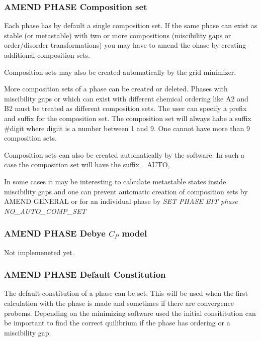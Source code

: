 \documentclass[12pt]{article}
\begin{document}
\subsubsection{AMEND PHASE Composition set}

Each phase has by default a single composition set.  If the same phase
can exist as stable (or metastable) with two or more compositions
(miscibility gaps or order/disorder transformations) you may have to
amend the ohase by creating additional composition sets.  

Composition sets may also be created automatically by the grid
minimizer.

More composition sets of a phase can be created or deleted.  Phases
with miscibility gaps or which can exist with different chemical
ordering like A2 and B2 must be treated as different composition sets.
The user can specify a prefix and suffix for the composition set.  The
composition set will always habe a suffix \#digit where digiit is a
number between 1 and 9.  One cannot have more than 9 composition sets.

Composition sets can also be created automatically by the software.  In
such a case the composition set will have the suffix \_AUTO,

In some cases it may be interesting to calculate metastable states inside
miscibility gaps and one can prevent automatic creation of composition
sets by {\rm AMEND GENERAL} or for an individual phase by {\em SET
PHASE BIT {\em phase} NO\_AUTO\_COMP\_SET}

\subsubsection{AMEND PHASE Debye $C_P$ model}

Not implemeneted yet.

\subsubsection{AMEND PHASE Default Constitution}

The default constitution of a phase can be set.  This will be used
when the first calculation with the phase is made and sometimes if
there are convergence probems.  Depending on the minimizing software
used the initial consititution can be important to find the correct
quilibrium if the phase has ordering or a miscibility gap.

\end{document}
